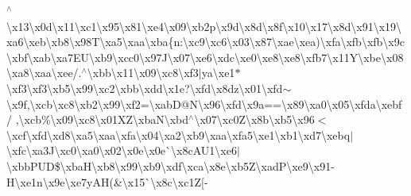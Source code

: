 $^\wedge$\textbackslash{}x13\textbackslash{}x0d\textbackslash{}x11\textbackslash{}xc1\textbackslash{}x95\textbackslash{}x81\textbackslash{}xe4\textbackslash{}x09\textbackslash{}xb2p\textbackslash{}x9d\textbackslash{}x8d\textbackslash{}x8f\textbackslash{}x10\textbackslash{}x17\textbackslash{}x8d\textbackslash{}x91\textbackslash{}x19\textbackslash{}xa6\textbackslash{}xeb\textbackslash{}xb8\textbackslash{}x98\+T\textbackslash{}xa5\textbackslash{}xaa\textbackslash{}xba\{n\+:\textbackslash{}xc9\textbackslash{}xc6\textbackslash{}x03\textbackslash{}x87\textbackslash{}xae\textbackslash{}xea)\textbackslash{}xfa\textbackslash{}xfb\textbackslash{}xfb\textbackslash{}x9c\textbackslash{}xbf\textbackslash{}xab\textbackslash{}xa7\+E\+U\textbackslash{}xb9\textbackslash{}xcc0\textbackslash{}x97\+J\textbackslash{}x07\textbackslash{}xe6\textbackslash{}xdc\textbackslash{}xe0\textbackslash{}xe8\textbackslash{}xe8\textbackslash{}xfb7\textbackslash{}x11\+Y\textbackslash{}xbe\textbackslash{}x08\textbackslash{}xa8\textbackslash{}xaa\textbackslash{}xee/.$^\wedge$\textbackslash{}xbb\textbackslash{}x11\textbackslash{}x09\textbackslash{}xc8\textbackslash{}xf3$\vert$ya\textbackslash{}xe1$\ast$\textbackslash{}xf3\textbackslash{}xf3\textbackslash{}xb5\textbackslash{}x99\textbackslash{}xc2\textbackslash{}xbb\textbackslash{}xdd\textbackslash{}x1e\textquotesingle{}\textquotesingle{}?\textbackslash{}xfd\textbackslash{}x8dz\textbackslash{}x01\textbackslash{}xfd$\sim$\textbackslash{}x9f,\textbackslash{}xcb\textbackslash{}xc8\textbackslash{}xb2\textbackslash{}x99\textbackslash{}xf2=\textbackslash{}xab\+D@\+N\textbackslash{}x96\textbackslash{}xfd\textbackslash{}x9a==\textbackslash{}x89\textbackslash{}xa0\textbackslash{}x05\textbackslash{}xfda\textbackslash{}xebf/ ,\textbackslash{}xcb\%\textbackslash{}x09\textbackslash{}xc8\textbackslash{}x01\+X\+Z\textbackslash{}xba\+N\textbackslash{}xbd$^\wedge$\textbackslash{}x07\textbackslash{}xc0\+Z\textbackslash{}x8b\textbackslash{}xb5\textbackslash{}x96$<$\textbackslash{}xcf\textbackslash{}xfd\textbackslash{}xd8\textbackslash{}xa5\textbackslash{}xaa\textbackslash{}xfa\textbackslash{}x04\textbackslash{}xa2\textbackslash{}xb9\textbackslash{}xaa\textbackslash{}xfa5\textbackslash{}xe1\textbackslash{}xb1\textbackslash{}xd7\textbackslash{}xebq$\vert$\textbackslash{}xfc\textbackslash{}xa3\+J\textbackslash{}xc0\textbackslash{}xa0\textbackslash{}x02\textbackslash{}x0e\textbackslash{}x0e\`{}\textbackslash{}x8c\+A\+U1\textbackslash{}xe6$\vert$\textbackslash{}xbb\+P\+U\+D\$\textbackslash{}xba\+H\textbackslash{}xb8\textbackslash{}x99\textbackslash{}xb9\textbackslash{}xdf\textbackslash{}xca\textbackslash{}x8e\textbackslash{}xb5\+Z\textbackslash{}xad\+P\textbackslash{}xe9\textbackslash{}x91-\/\+H\textbackslash{}xe1n\textbackslash{}x9e\textbackslash{}xe7y\+A\+H(\&\textbackslash{}x15\`{}\textbackslash{}x8c\textbackslash{}xc1\+Z\mbox{[}-\/ 